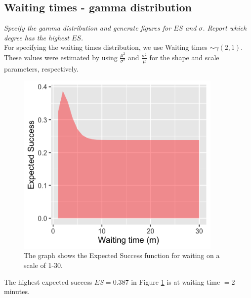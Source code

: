 \documentclass[11pt,a4paper,oneside]{article}
\begin{document}
\subsection{Waiting times - gamma distribution}
\textit{Specify the gamma distribution and generate figures for $ES$ and $\sigma$. Report which degree has the highest $ES$.}\\

For specifying the waiting times distribution, we use Waiting times $\sim \mathcal{\gamma}(2, 1)$. These values were estimated by using $\frac{\mu^2}{\sigma^2}$ and $\frac{\sigma^2}{\mu}$ for the shape and scale parameters, respectively. 

\begin{figure}[H]
    \centering
    \includegraphics[width=100mm]{figs/Question_2_waiting_time_es.png}
    \caption{The graph shows the Expected Success function for waiting on a scale of 1-30.}
  \label{fig:q2_waiting_es}
\end{figure}

The highest expected success $ES = 0.387$ in Figure \ref{fig:q2_waiting_es} is at waiting time $= 2$ minutes.
\end{document}
